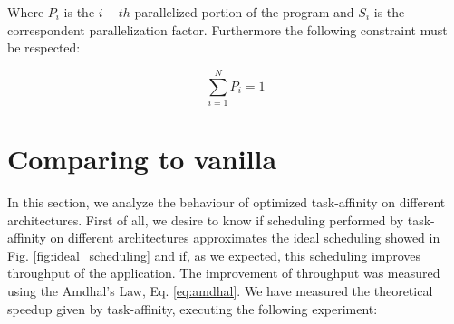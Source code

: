 Where $P_{i}$ is the $i-th$ parallelized portion of the program and $S_{i}$ is the correspondent parallelization factor. Furthermore the following 
constraint must be respected:

\begin{equation}
       \sum_{i=1}^N P_{i} = 1
\label{eq:contr_amdhal}
\end{equation}
\newpage

\section{Comparing to vanilla}

In this section, we analyze the behaviour of optimized task-affinity on different architectures. First of all, we desire to know if scheduling performed by 
task-affinity on different architectures approximates the ideal scheduling showed in Fig. \ref{fig:ideal_scheduling} and if, as we expected, this 
scheduling improves throughput of the application. The improvement of throughput was measured using the Amdhal's Law, Eq. \ref{eq:amdhal}. We have measured 
the theoretical speedup given by task-affinity, executing the following experiment:

